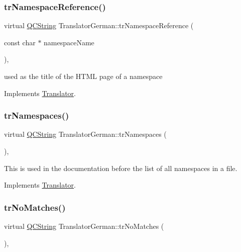 \subsubsection{\texorpdfstring{trNamespaceReference()}{trNamespaceReference()}}
{\footnotesize\ttfamily virtual \mbox{\hyperlink{class_q_c_string}{Q\+C\+String}} Translator\+German\+::tr\+Namespace\+Reference (\begin{DoxyParamCaption}\item[{const char $\ast$}]{namespace\+Name }\end{DoxyParamCaption})\hspace{0.3cm}{\ttfamily [inline]}, {\ttfamily [virtual]}}

used as the title of the H\+T\+ML page of a namespace 

Implements \mbox{\hyperlink{class_translator}{Translator}}.

\mbox{\label{class_translator_german_a9f63ce929b5e0a8eba8fc29c3404537e}} 
\subsubsection{\texorpdfstring{trNamespaces()}{trNamespaces()}}
{\footnotesize\ttfamily virtual \mbox{\hyperlink{class_q_c_string}{Q\+C\+String}} Translator\+German\+::tr\+Namespaces (\begin{DoxyParamCaption}{ }\end{DoxyParamCaption})\hspace{0.3cm}{\ttfamily [inline]}, {\ttfamily [virtual]}}

This is used in the documentation before the list of all namespaces in a file. 

Implements \mbox{\hyperlink{class_translator}{Translator}}.

\mbox{\label{class_translator_german_a9e9d15260ea7a7f3bf70d315088e75a5}} 
\subsubsection{\texorpdfstring{trNoMatches()}{trNoMatches()}}
{\footnotesize\ttfamily virtual \mbox{\hyperlink{class_q_c_string}{Q\+C\+String}} Translator\+German\+::tr\+No\+Matches (\begin{DoxyParamCaption}{ }\end{DoxyParamCaption})\hspace{0.3cm}{\ttfamily [inline]}, {\ttfamily [virtual]}}

